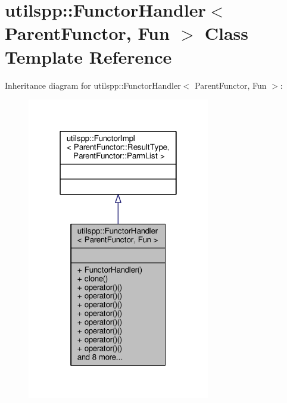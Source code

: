 \hypertarget{classutilspp_1_1FunctorHandler}{\section{utilspp\-:\-:Functor\-Handler$<$ Parent\-Functor, Fun $>$ Class Template Reference}
\label{classutilspp_1_1FunctorHandler}
}


Inheritance diagram for utilspp\-:\-:Functor\-Handler$<$ Parent\-Functor, Fun $>$\-:\nopagebreak
\begin{figure}[H]
\begin{center}
\leavevmode
\includegraphics[width=226pt]{classutilspp_1_1FunctorHandler__inherit__graph}
\end{center}
\end{figure}


